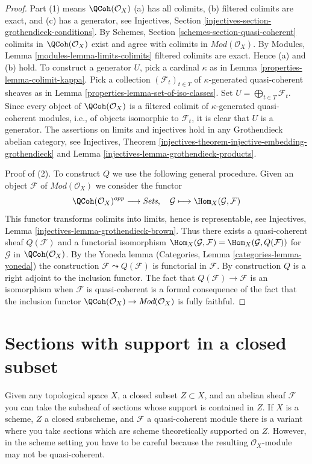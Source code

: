 \begin{proof}

Part (1) means $\QCoh(\mathcal{O}_X)$ (a) has all colimits,
(b) filtered colimits are exact, and (c) has a generator, see
Injectives, Section \ref{injectives-section-grothendieck-conditions}.
By Schemes, Section \ref{schemes-section-quasi-coherent}
colimits in $\QCoh(\mathcal{O}_X)$ exist and agree
with colimits in $\textit{Mod}(\mathcal{O}_X)$. By
Modules, Lemma \ref{modules-lemma-limits-colimits}
filtered colimits are exact. Hence (a) and (b) hold.
To construct a generator $U$, pick a cardinal $\kappa$ as in
Lemma \ref{properties-lemma-colimit-kappa}. Pick a collection
$(\mathcal{F}_t)_{t \in T}$ of $\kappa$-generated quasi-coherent sheaves as in
Lemma \ref{properties-lemma-set-of-iso-classes}. Set
$U = \bigoplus_{t \in T} \mathcal{F}_t$. Since every object of
$\QCoh(\mathcal{O}_X)$ is a filtered colimit of $\kappa$-generated
quasi-coherent modules, i.e., of objects isomorphic to $\mathcal{F}_t$,
it is clear that $U$ is a generator.
The assertions on limits and injectives hold in any
Grothendieck abelian category, see
Injectives, Theorem
\ref{injectives-theorem-injective-embedding-grothendieck} and
Lemma \ref{injectives-lemma-grothendieck-products}.

\medskip\noindent
Proof of (2). To construct $Q$ we use the following general procedure.
Given an object $\mathcal{F}$ of $\textit{Mod}(\mathcal{O}_X)$
we consider the functor
$$
\QCoh(\mathcal{O}_X)^{opp} \longrightarrow \textit{Sets},\quad
\mathcal{G} \longmapsto \Hom_X(\mathcal{G}, \mathcal{F})
$$
This functor transforms colimits into limits,
hence is representable, see
Injectives, Lemma \ref{injectives-lemma-grothendieck-brown}.
Thus there exists a quasi-coherent sheaf $Q(\mathcal{F})$
and a functorial isomorphism
$\Hom_X(\mathcal{G}, \mathcal{F}) = \Hom_X(\mathcal{G}, Q(\mathcal{F}))$
for $\mathcal{G}$ in $\QCoh(\mathcal{O}_X)$. By the Yoneda lemma
(Categories, Lemma \ref{categories-lemma-yoneda})
the construction $\mathcal{F} \leadsto Q(\mathcal{F})$ is
functorial in $\mathcal{F}$. By construction $Q$ is a right
adjoint to the inclusion functor.
The fact that $Q(\mathcal{F}) \to \mathcal{F}$ is an isomorphism
when $\mathcal{F}$ is quasi-coherent is a formal consequence of the fact
that the inclusion functor
$\QCoh(\mathcal{O}_X) \to \textit{Mod}(\mathcal{O}_X)$
is fully faithful.
\end{proof}

\section{Sections with support in a closed subset}
\label{properties-section-sections-with-support-in-closed}
Given any topological space $X$, a closed subset $Z \subset X$, and an
abelian sheaf $\mathcal{F}$ you can take the subsheaf of sections whose
support is contained in $Z$. If $X$ is a scheme, $Z$ a closed
subscheme, and $\mathcal{F}$ a quasi-coherent module there is a variant
where you take sections which are scheme theoretically supported
on $Z$. However, in the scheme setting you have to be careful because
the resulting $\mathcal{O}_X$-module may not be quasi-coherent.

